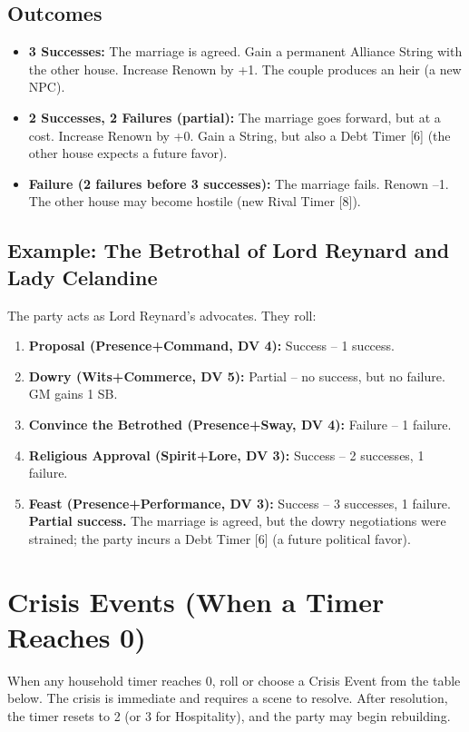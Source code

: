 \documentclass[11pt]{article}
\begin{document}
\subsection*{Outcomes}
\begin{itemize}
    \item \textbf{3 Successes:} The marriage is agreed. Gain a permanent Alliance String with the other house. Increase Renown by +1. The couple produces an heir (a new NPC).
    \item \textbf{2 Successes, 2 Failures (partial):} The marriage goes forward, but at a cost. Increase Renown by +0. Gain a String, but also a Debt Timer [6] (the other house expects a future favor).
    \item \textbf{Failure (2 failures before 3 successes):} The marriage fails. Renown --1. The other house may become hostile (new Rival Timer [8]).
\end{itemize}

\subsection*{Example: The Betrothal of Lord Reynard and Lady Celandine}
The party acts as Lord Reynard's advocates. They roll:
\begin{enumerate}
    \item \textbf{Proposal (Presence+Command, DV 4):} Success -- 1 success.
    \item \textbf{Dowry (Wits+Commerce, DV 5):} Partial -- no success, but no failure. GM gains 1 SB.
    \item \textbf{Convince the Betrothed (Presence+Sway, DV 4):} Failure -- 1 failure.
    \item \textbf{Religious Approval (Spirit+Lore, DV 3):} Success -- 2 successes, 1 failure.
    \item \textbf{Feast (Presence+Performance, DV 3):} Success -- 3 successes, 1 failure. \textbf{Partial success.} The marriage is agreed, but the dowry negotiations were strained; the party incurs a Debt Timer [6] (a future political favor).
\end{enumerate}

\section{Crisis Events (When a Timer Reaches 0)}

When any household timer reaches 0, roll or choose a Crisis Event from the table below. The crisis is immediate and requires a scene to resolve. After resolution, the timer resets to 2 (or 3 for Hospitality), and the party may begin rebuilding.
\end{document}
